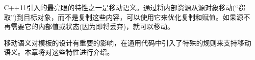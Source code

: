 C++11引入的最亮眼的特性之一是移动语义。通过将内部资源从源对象移动(“窃取”)到目标对象，而不是复制这些内容，可以使用它来优化复制和赋值。如果源不再需要它的内部值或状态(因为即将丢弃)，就可以移动。

移动语义对模板的设计有重要的影响，在通用代码中引入了特殊的规则来支持移动语义。本章将对这些特性进行介绍。